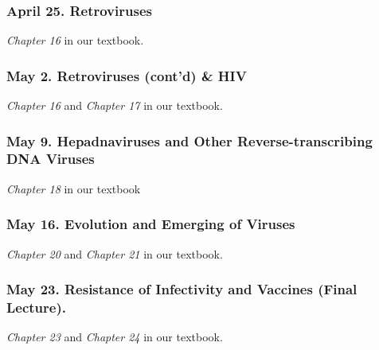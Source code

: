 \subsubsection{April 25. Retroviruses}\label{april-25.-retroviruses}

\emph{Chapter 16} in our textbook.

\subsubsection{May 2. Retroviruses (cont'd) \&
HIV}\label{may-2.-retroviruses-contd-hiv}

\emph{Chapter 16} and \emph{Chapter 17} in our textbook.

\subsubsection{May 9. Hepadnaviruses and Other Reverse-transcribing DNA
Viruses}\label{may-9.-hepadnaviruses-and-other-reverse-transcribing-dna-viruses}

\emph{Chapter 18} in our textbook

\subsubsection{May 16. Evolution and Emerging of
Viruses}\label{may-16.-evolution-and-emerging-of-viruses}

\emph{Chapter 20} and \emph{Chapter 21} in our textbook.

\subsubsection{May 23. Resistance of Infectivity and Vaccines (Final
Lecture).}\label{may-23.-resistance-of-infectivity-and-vaccines-final-lecture.}

\emph{Chapter 23} and \emph{Chapter 24} in our textbook.
